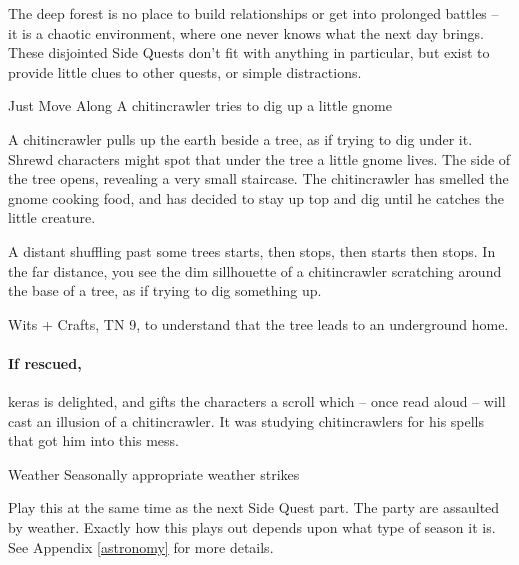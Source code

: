 \begin{multicols}{2}
\stopcontents[sq]

\label{interruptions}

\startcontents[sq]

\sqminitoc

\noindent
The deep forest is no place to build relationships or get into prolonged battles -- it is a chaotic environment, where one never knows what the next day brings.
These disjointed Side Quests don't fit with anything in particular, but exist to provide little clues to other quests, or simple distractions.

{Just Move Along}%
{A chitincrawler tries to dig up a little gnome}%

A chitincrawler pulls up the earth beside a tree, as if trying to dig under it.
Shrewd characters might spot that under the tree a little gnome lives.
The side of the tree opens, revealing a very small staircase.
The chitincrawler has smelled the gnome cooking food, and has decided to stay up top and dig until he catches the little creature.

\begin{boxtext}

	A distant shuffling past some trees starts, then stops, then starts then stops.
	In the far distance, you see the dim sillhouette of a chitincrawler scratching around the base of a tree, as if trying to dig something up.

\end{boxtext}

Wits + Crafts, TN 9, to understand that the tree leads to an underground home.

\chitincrawler

\keras

\paragraph{If rescued,}
\gls{keras} is delighted, and gifts the characters a scroll which -- once read aloud -- will cast an illusion of a chitincrawler.  It was studying chitincrawlers for his spells that got him into this mess.

{Weather}%
{Seasonally appropriate weather strikes}%

Play this at the same time as the next Side Quest part.
The party are assaulted by weather.
Exactly how this plays out depends upon what type of season it is.
See Appendix \ref{astronomy} for more details.


\end{multicols}
